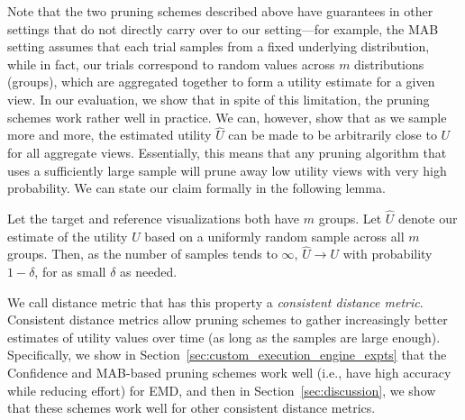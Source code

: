 Note that the two pruning schemes described above have guarantees
in other settings that do not directly carry over to our setting---for example,
the MAB setting assumes that each trial samples from a fixed underlying distribution,
while in fact, our trials correspond to random values across $m$ distributions (groups),
which are aggregated together to form a utility estimate for a given view. 
In our evaluation, we show that in spite of this limitation, the pruning schemes
work rather well in practice. 
We can, however, show that as we sample more and more, the estimated utility
$\hat{U}$ can be made to be arbitrarily close to $U$ for all aggregate views.
Essentially, this means that any pruning algorithm that uses a sufficiently
large sample will prune away low utility views with very high probability.
We can state our claim formally in the following lemma. 
\vspace{-5pt}
\begin{lemma} [Consistency]
Let the target and reference visualizations
both have $m$ groups.
Let $\hat{U}$ denote our estimate of the utility $U$ 
based on a uniformly random sample 
across all $m$ groups. 
Then, as the number of samples tends to $\infty$, $\hat{U} \rightarrow U$
with probability $1-\delta$, for as small $\delta$ as needed.
\end{lemma}
\vspace{-5pt}
We call distance metric that has this property a {\em
consistent distance metric}.
Consistent distance metrics allow pruning schemes
to gather increasingly better estimates of utility values
over time (as long as the samples are large enough). 
Specifically, we show in Section~\ref{sec:custom_execution_engine_expts}
that the Confidence and MAB-based pruning schemes 
work well (i.e., have high accuracy while reducing
effort) for EMD, and then
in Section~\ref{sec:discussion}, we show that 
these schemes work well for other consistent distance metrics.



